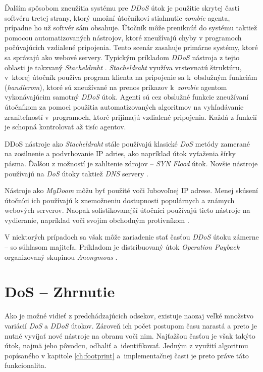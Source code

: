 \documentclass[
  digital, %
  oneside, %
  table,   %
  lof,     %
  nolot,   %
  nocover
]{fithesis3}
\begin{document}
Ďalším spôsobom zneužitia systému pre \textit{DDoS} útok je použitie skrytej časti softvéru tretej
strany, ktorý umožní útočníkovi stiahnutie \textit{zombie} agenta, prípadne ho už softvér sám obsahuje.
Útočník môže preniknúť do systému taktiež pomocou automatizovaných nástrojov, ktoré zneužívajú chyby v
programoch počúvajúcich vzdialené pripojenia. Tento scenár zasahuje primárne systémy, ktoré sa správajú
ako webové servery. Typickým príkladom \textit{DDoS} nástroja z tejto oblasti je takzvaný
\textit{Stacheldraht} \cite{Dittrich:DoST}. \textit{Stacheldraht} využíva vrstevnatú štruktúru, v~ktorej útočník používa
program klienta na pripojenie sa k~obslužným funkciám (\textit{handlerom}), ktoré sú zneužívané na prenos príkazov
k~\textit{zombie} agentom vykonávajúcim samotný \textit{DDoS} útok. Agenti sú cez 
obslužné funkcie
zneužívaní útočníkom za pomoci použitia automatizovaných algoritmov na vyhľadávanie zraniteľností
v~programoch, ktoré prijímajú vzdialené pripojenia. Každá z funkcií je schopná kontrolovať až 
tisíc
agentov. 

DDoS nástroje ako \textit{Stacheldraht} stále používajú klasické \textit{DoS} metódy zamerané na
zosilnenie a podvrhovanie IP adries, ako napríklad útok vyťaženia šírky pásma. Ďalšou z možností je
zahltenie zdrojov -- \textit{SYN Flood} útok. Novšie nástroje používajú na \textit{DoS} útoky taktiež
\textit{DNS} servery \cite{Dittrich:DoST}.

Nástroje ako \textit{MyDoom} môžu byť použité voči ľubovoľnej IP adrese. Menej skúsení útočníci ich
používajú k znemožneniu dostupnosti populárnych a známych webových serverov. Naopak sofistikovanejší
útočníci používajú tieto nástroje na vydieranie, napríklad voči svojim obchodným protivníkom \cite{Karami:2015:DoSaaS}.

V niektorých prípadoch sa však môže zariadenie stať časťou \textit{DDoS} útoku zámerne -- so súhlasom
majiteľa. Príkladom je distribuovaný útok \textit{Operation Payback} organizovaný skupinou
\textit{Anonymous} \cite{Leyden:2010:DoSaaS}.

\section{DoS -- Zhrnutie}
Ako je možné vidieť z predchádzajúcich odsekov, existuje naozaj veľké množstvo
variácií \textit{DoS} a \textit{DDoS} útokov. Zároveň ich počet postupom času
narastá a preto je nutné vyvíjať nové nástroje na obranu voči nim. Najťažšou časťou
je však takýto útok, najmä jeho pôvodcu, odhaliť a~identifikovať. Jedným z využití
algoritmu popísaného v kapitole \ref{ch:footprint} a~implementačnej časti je preto
práve táto funkcionalita.
\end{document}
